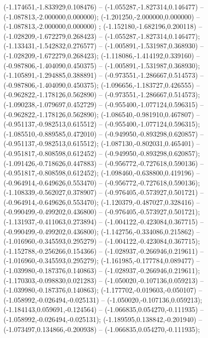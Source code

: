  (-1.174651,-1.833929,0.108476) -- (-1.055287,-1.827314,0.146477) -- (-1.087813,-2.000000,0.000000);
 (-1.201250,-2.000000,0.000000) -- (-1.087813,-2.000000,0.000000) ;
 (-1.152180,-1.682196,0.200118) -- (-1.028209,-1.672279,0.268423) -- (-1.055287,-1.827314,0.146477);
 (-1.133431,-1.542832,0.276577) -- (-1.005891,-1.531987,0.368930) -- (-1.028209,-1.672279,0.268423);
 (-1.118086,-1.414192,0.339160) -- (-0.987806,-1.404090,0.450375) -- (-1.005891,-1.531987,0.368930);
 (-1.105891,-1.294885,0.388891) -- (-0.973551,-1.286667,0.514573) -- (-0.987806,-1.404090,0.450375);
 (-1.096656,-1.183727,0.426555) -- (-0.962822,-1.178126,0.562890) -- (-0.973551,-1.286667,0.514573);
 (-1.090238,-1.079697,0.452729) -- (-0.955400,-1.077124,0.596315) -- (-0.962822,-1.178126,0.562890);
 (-1.086540,-0.981910,0.467807) -- (-0.951137,-0.982513,0.615512) -- (-0.955400,-1.077124,0.596315);
 (-1.085510,-0.889585,0.472010) -- (-0.949950,-0.893298,0.620857) -- (-0.951137,-0.982513,0.615512);
 (-1.087130,-0.802031,0.465401) -- (-0.951817,-0.808598,0.612452) -- (-0.949950,-0.893298,0.620857);
 (-1.091426,-0.718626,0.447883) -- (-0.956772,-0.727618,0.590136) -- (-0.951817,-0.808598,0.612452);
 (-1.098460,-0.638800,0.419196) -- (-0.964914,-0.649626,0.553470) -- (-0.956772,-0.727618,0.590136);
 (-1.108339,-0.562027,0.378907) -- (-0.976405,-0.573927,0.501721) -- (-0.964914,-0.649626,0.553470);
 (-1.120379,-0.487027,0.328416) -- (-0.990499,-0.499202,0.436800) -- (-0.976405,-0.573927,0.501721);
 (-1.131937,-0.411063,0.273894) -- (-1.004122,-0.423084,0.367715) -- (-0.990499,-0.499202,0.436800);
 (-1.142756,-0.334086,0.215862) -- (-1.016960,-0.345593,0.295279) -- (-1.004122,-0.423084,0.367715);
 (-1.152788,-0.256266,0.154366) -- (-1.028937,-0.266946,0.219611) -- (-1.016960,-0.345593,0.295279);
 (-1.161985,-0.177784,0.089477) -- (-1.039980,-0.187376,0.140863) -- (-1.028937,-0.266946,0.219611);
 (-1.170303,-0.098830,0.021283) -- (-1.050020,-0.107136,0.059213) -- (-1.039980,-0.187376,0.140863);
 (-1.177702,-0.019603,-0.050107) -- (-1.058992,-0.026494,-0.025131) -- (-1.050020,-0.107136,0.059213);
 (-1.184143,0.059691,-0.124564) -- (-1.066835,0.054270,-0.111935) -- (-1.058992,-0.026494,-0.025131);
 (-1.189595,0.138842,-0.201940) -- (-1.073497,0.134866,-0.200938) -- (-1.066835,0.054270,-0.111935);
